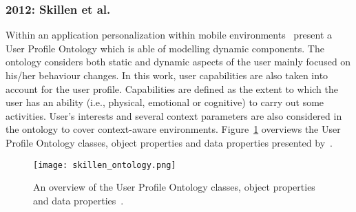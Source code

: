
\subsubsection{2012: Skillen et al.}
\label{sec:skillen}

Within an application personalization within mobile 
environments~\citet{skillen2012ontological} present a User Profile Ontology 
which is able of modelling dynamic components. The ontology considers both 
static and dynamic aspects of the user mainly focused on his/her behaviour 
changes. In this work, user capabilities are also taken into account for the 
user profile. Capabilities are defined as the extent to which the user has an 
ability (i.e., physical, emotional or cognitive) to carry out some activities. 
User's interests and several context parameters are also considered in the 
ontology to cover context-aware environments. Figure~\ref{fig:skillen_ontology}
overviews the User Profile Ontology classes, object properties and data properties
presented by~\citeauthor{skillen2012ontological}.

\begin{figure}
\centering
\texttt{[image: skillen\_ontology.png]}
\caption{An overview of the User Profile Ontology classes, object properties and 
data properties~\citep{skillen2012ontological}.}
\label{fig:skillen_ontology}
\end{figure}